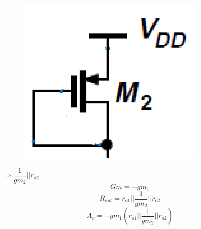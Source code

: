 \documentclass{beamer}
\begin{document}
\begin{frame}
\begin{minipage}{0.45\linewidth}
    \end{minipage}
    \begin{minipage}{0.535\linewidth}
        \begin{minipage}{0.3\linewidth}
            \begin{figure}[H]
                \includegraphics[width=\linewidth]{Rin22}
            \end{figure}
        \end{minipage}
        $\Rightarrow \dfrac{1}{gm_2}||r_{o2}$\\
        \begin{equation*}
            Gm = -gm_1
        \end{equation*}
        \begin{equation*}
            R_{out} = r_{o1}||\dfrac{1}{gm_2}||r_{o2}
        \end{equation*}
        \begin{equation*}
            A_v = -gm_1\left( r_{o1}||\dfrac{1}{gm_2}||r_{o2} \right)
        \end{equation*}
    \end{minipage}
\end{frame}
\end{document}
